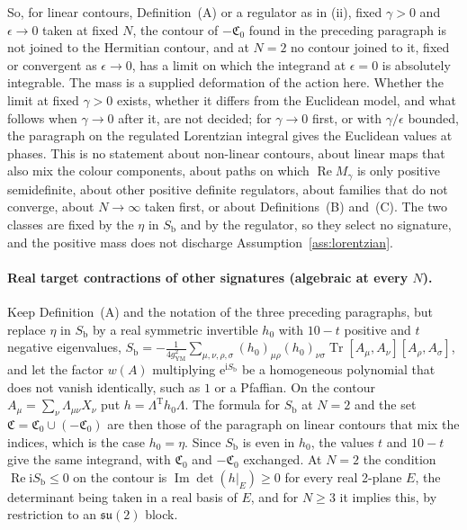 So, for linear contours, Definition~(A) or a regulator as in (ii), fixed \(\gamma>0\) and \(\epsilon\to0\) taken at fixed \(N\), the contour of \(-\mathfrak C_0\) found in the preceding paragraph is not joined to the Hermitian contour, and at \(N=2\) no contour joined to it, fixed or convergent as \(\epsilon\to0\), has a limit on which the integrand at \(\epsilon=0\) is absolutely integrable. The mass is a supplied deformation of the action here. Whether the limit at fixed \(\gamma>0\) exists, whether it differs from the Euclidean model, and what follows when \(\gamma\to0\) after it, are not decided; for \(\gamma\to0\) first, or with \(\gamma/\epsilon\) bounded, the paragraph on the regulated Lorentzian integral gives the Euclidean values at phases. This is no statement about non-linear contours, about linear maps that also mix the colour components, about paths on which \(\operatorname{Re}M_\gamma\) is only positive semidefinite, about other positive definite regulators, about families that do not converge, about \(N\to\infty\) taken first, or about Definitions~(B) and~(C). The two classes are fixed by the \(\eta\) in \(S_{\mathrm b}\) and by the regulator, so they select no signature, and the positive mass does not discharge Assumption~\ref{ass:lorentzian}.

\paragraph{Real target contractions of other signatures (algebraic at every \(N\)).}
Keep Definition~(A) and the notation of the three preceding paragraphs, but replace \(\eta\) in \(S_{\mathrm b}\) by a real symmetric invertible \(h_0\) with \(10-t\) positive and \(t\) negative eigenvalues, \(S_{\mathrm b}=-\tfrac1{4g_{\mathrm{YM}}^2}\sum_{\mu,\nu,\rho,\sigma}(h_0)_{\mu\rho}(h_0)_{\nu\sigma}\operatorname{Tr}[A_\mu,A_\nu][A_\rho,A_\sigma]\), and let the factor \(w(A)\) multiplying \(\mathrm e^{\mathrm iS_{\mathrm b}}\) be a homogeneous polynomial that does not vanish identically, such as \(1\) or a Pfaffian. On the contour \(A_\mu=\sum_\nu\Lambda_{\mu\nu}X_\nu\) put \(h=\Lambda^{\mathrm T}h_0\Lambda\). The formula for \(S_{\mathrm b}\) at \(N=2\) and the set \(\mathfrak C=\mathfrak C_0\cup(-\mathfrak C_0)\) are then those of the paragraph on linear contours that mix the indices, which is the case \(h_0=\eta\). Since \(S_{\mathrm b}\) is even in \(h_0\), the values \(t\) and \(10-t\) give the same integrand, with \(\mathfrak C_0\) and \(-\mathfrak C_0\) exchanged. At \(N=2\) the condition \(\operatorname{Re}\mathrm iS_{\mathrm b}\le0\) on the contour is \(\operatorname{Im}\det(h|_E)\ge0\) for every real 2-plane \(E\), the determinant being taken in a real basis of \(E\), and for \(N\ge3\) it implies this, by restriction to an \(\mathfrak{su}(2)\) block.

